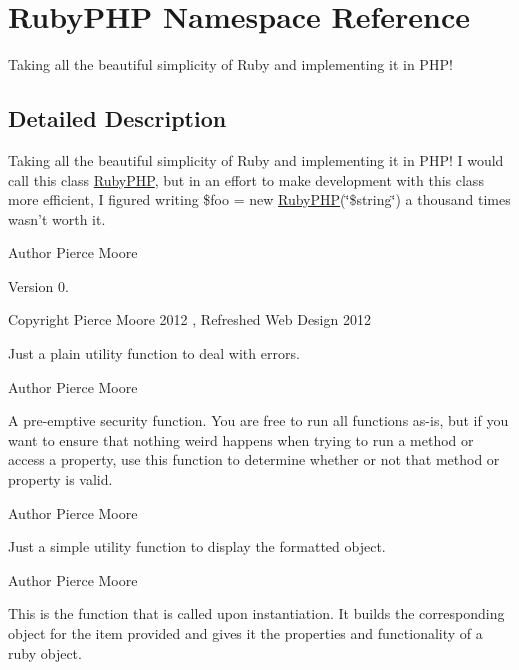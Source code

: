\hypertarget{namespace_ruby_p_h_p}{\section{Ruby\-P\-H\-P Namespace Reference}
\label{namespace_ruby_p_h_p}
}


Taking all the beautiful simplicity of Ruby and implementing it in P\-H\-P!  




\subsection{Detailed Description}
Taking all the beautiful simplicity of Ruby and implementing it in P\-H\-P! I would call this class \hyperlink{namespace_ruby_p_h_p}{Ruby\-P\-H\-P}, but in an effort to make development with this class more efficient, I figured writing \$foo = new \hyperlink{namespace_ruby_p_h_p}{Ruby\-P\-H\-P}(\char`\"{}\$string\char`\"{}) a thousand times wasn't worth it.

\begin{DoxyAuthor}{Author}
Pierce Moore 
\end{DoxyAuthor}
\begin{DoxyVersion}{Version}
0. 
\end{DoxyVersion}
\begin{DoxyCopyright}{Copyright}
Pierce Moore 2012 , Refreshed Web Design 2012
\end{DoxyCopyright}
Just a plain utility function to deal with errors.

\begin{DoxyAuthor}{Author}
Pierce Moore
\end{DoxyAuthor}
A pre-\/emptive security function. You are free to run all functions as-\/is, but if you want to ensure that nothing weird happens when trying to run a method or access a property, use this function to determine whether or not that method or property is valid.

\begin{DoxyAuthor}{Author}
Pierce Moore
\end{DoxyAuthor}
Just a simple utility function to display the formatted object.

\begin{DoxyAuthor}{Author}
Pierce Moore
\end{DoxyAuthor}
This is the function that is called upon instantiation. It builds the corresponding object for the item provided and gives it the properties and functionality of a ruby object.

